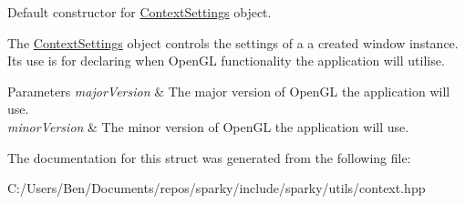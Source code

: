 Default constructor for \hyperlink{structsparky_1_1_context_settings}{Context\+Settings} object. 

The \hyperlink{structsparky_1_1_context_settings}{Context\+Settings} object controls the settings of a a created window instance. It\textquotesingle{}s use is for declaring when Open\+GL functionality the application will utilise.


\begin{DoxyParams}{Parameters}
{\em major\+Version} & The major version of Open\+GL the application will use. \\
\hline
{\em minor\+Version} & The minor version of Open\+GL the application will use. \\
\hline
\end{DoxyParams}


The documentation for this struct was generated from the following file\+:\begin{DoxyCompactItemize}
\item 
C\+:/\+Users/\+Ben/\+Documents/repos/sparky/include/sparky/utils/context.\+hpp\end{DoxyCompactItemize}
